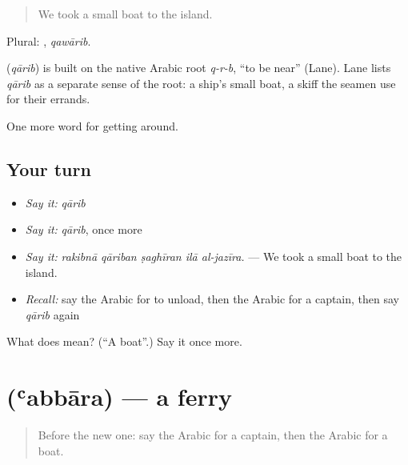 \begin{quote}
We took a small boat to the island.
\end{quote}

Plural: , \emph{qawārib}.

\begin{cousinweb}
\textbf{} (\emph{qārib}) is built on the native Arabic root \emph{q-r-b}, \textquotedblleft{}to be near\textquotedblright{} (Lane). Lane lists \emph{qārib} as a separate sense of the root: a ship's small boat, a skiff the seamen use for their errands.
\end{cousinweb}

\begin{grammarlens}[title={What you've built}]
One more word for getting around.
\end{grammarlens}

\subsection*{Your turn}
\begin{itemize}
\raggedright
  \item \emph{Say it:} \emph{qārib}
  \item \emph{Say it:} \emph{qārib}, once more
  \item \emph{Say it:} \emph{rakibnā qāriban ṣaghīran ilā al-jazīra.} — We took a small boat to the island.
  \item \emph{Recall:} say the Arabic for to unload, then the Arabic for a captain, then say \emph{qārib} again
\end{itemize}

\begin{tcolorbox}[breakable,colback=teal!4,colframe=teal!35!black,title={Before you move on}]
What does  mean? (\textquotedblleft{}A boat\textquotedblright{}.) Say it once more.
\end{tcolorbox}
\section[\texorpdfstring{\ar{عبارة} (ʿabbāra)}{عبارة (ʿabbāra)}]{ (ʿabbāra) — a ferry}

\label{lesson:AR-C429-abbara}



\begin{quote}
Before the new one: say the Arabic for a captain, then the Arabic for a boat.
\end{quote}

